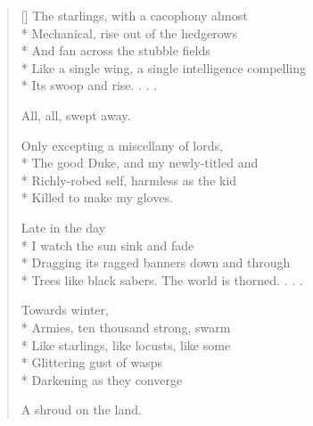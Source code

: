 \label{ch:lear_bs}
\settowidth{\versewidth}{Trees like black sabers. \qquad The world is thorned. . . .}
\begin{verse}[\versewidth]
The starlings, with a cacophony almost\\*
Mechanical, rise out of the hedgerows\\*
And fan across the stubble fields\\*
Like a single wing, a single intelligence compelling\\*
Its swoop and rise. . . .

\hspace*{3\vgap} All, all, swept away.

Only excepting a miscellany of lords,\\*
The good Duke, and my newly-titled and\\*
Richly-robed self, harmless as the kid\\*
Killed to make my gloves.

\hspace*{3\vgap} Late in the day\\*
I watch the sun sink and fade\\*
Dragging its ragged banners down and through\\*
Trees like black sabers. \qquad The world is thorned. . . .

Towards winter,\\*
Armies, ten thousand strong, swarm\\*
Like starlings, like locusts, like some\\*
Glittering gust of wasps\\*
Darkening as they converge

A shroud on the land.\qquad
\end{verse}
